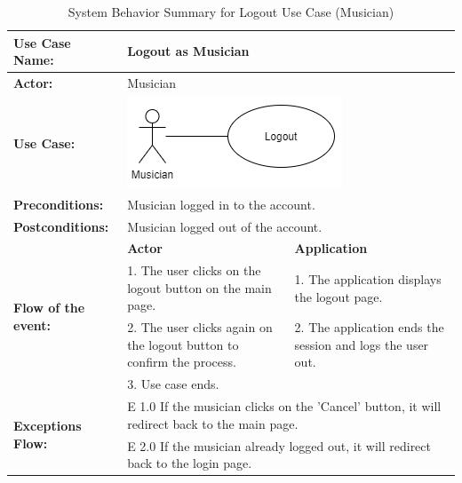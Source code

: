 \begin{longtable}{|p{3cm}|p{5cm}|p{5cm}|}
    \caption{System Behavior Summary for Logout Use Case (Musician)} \\
    \hline
    \textbf{Use Case Name:} & \multicolumn{2}{l|}{Logout as Musician} \\ \hline
    \textbf{Actor:} & \multicolumn{2}{l|}{Musician} \\ \hline
    \textbf{Use Case:} & \multicolumn{2}{l|}{\includegraphics[width=0.5\linewidth]{mainmatter/images/sucd6.png}} \\ \hline
    \textbf{Preconditions:} & \multicolumn{2}{p{10cm}|}{Musician logged in to the account.} \\ \hline
    \textbf{Postconditions:} & \multicolumn{2}{p{10cm}|}{Musician logged out of the account.} \\ \hline
    \multirow{4}{3cm}{\raggedright \textbf{Flow of the event:}} & \textbf{Actor} & \textbf{Application} \\ \cline{2-3}
    & 1. The user clicks on the logout button on the main page. & 1. The application displays the logout page. \\ \cline{2-3}
    & 2. The user clicks again on the logout button to confirm the process. & 2. The application ends the session and logs the user out.  \\ \cline{2-3}
    & 3. Use case ends. &  \\ \hline
    \multirow{2}{3cm}{\raggedright \textbf{Exceptions Flow:}} & \multicolumn{2}{p{10cm}|}{\raggedright E 1.0 If the musician clicks on the 'Cancel' button, it will redirect back to the main page.} \\ \cline{2-3}
    & \multicolumn{2}{p{10cm}|}{\raggedright E 2.0 If the musician already logged out, it will redirect back to the login page.} \\ \hline
\end{longtable}
\pagebreak


